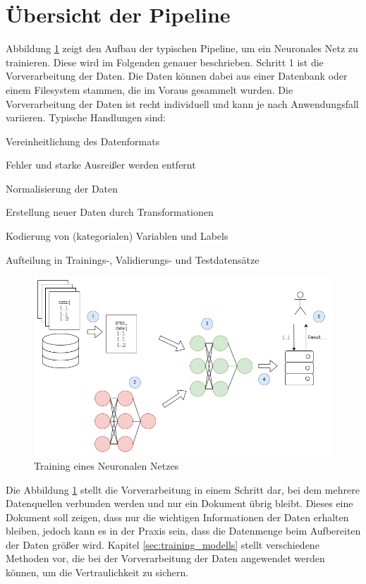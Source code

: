 \section{Übersicht der Pipeline}\label{sec:ml_pipeline}


Abbildung \ref{fig:ml_pipeline} zeigt den Aufbau der typischen Pipeline, um ein Neuronales Netz zu trainieren. 
Diese wird im Folgenden genauer beschrieben.
Schritt 1 ist die Vorverarbeitung der Daten.
Die Daten können dabei aus einer Datenbank oder einem Filesystem stammen, die im Voraus gesammelt wurden.
Die Vorverarbeitung der Daten ist recht individuell und kann je nach Anwendungsfall variieren. 
Typische Handlungen sind:
\begin{compactitem}
\item Vereinheitlichung des Datenformats
\item Fehler und starke Ausreißer werden entfernt
\item Normalisierung der Daten
\item Erstellung neuer Daten durch Transformationen
\item Kodierung von (kategorialen) Variablen und Labels
\item Aufteilung in Trainings-, Validierungs- und Testdatensätze
\end{compactitem}
\begin{figure}[!htb]
    \centering
    \includegraphics[width=14cm]{figures/ml_pipeline.png}
    \caption{Training eines Neuronalen Netzes}
    \label{fig:ml_pipeline}
\end{figure} 

Die Abbildung \ref{fig:ml_pipeline} stellt die Vorverarbeitung in einem Schritt dar, bei dem mehrere Datenquellen verbunden werden und nur ein Dokument übrig bleibt. 
Dieses eine Dokument soll zeigen, dass nur die wichtigen Informationen der Daten erhalten bleiben, jedoch kann es in der Praxis sein, dass die Datenmenge beim Aufbereiten der Daten größer wird. 
Kapitel \ref{sec:training_modells} stellt verschiedene Methoden vor, die bei der Vorverarbeitung der Daten angewendet werden können, um die Vertraulichkeit zu sichern.

